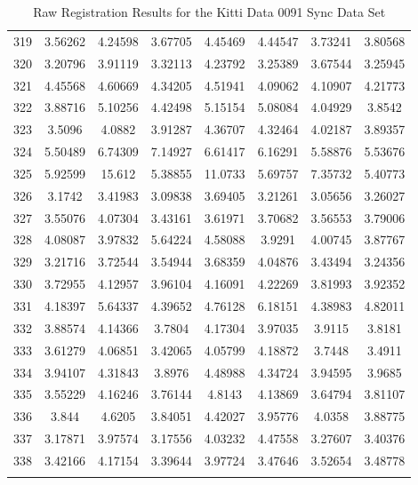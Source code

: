 \begin{center}
\begin{longtable}{cccccccc}
319 & 3.56262 & 4.24598 & 3.67705 & 4.45469 & 4.44547 & 3.73241 & 3.80568\\
320 & 3.20796 & 3.91119 & 3.32113 & 4.23792 & 3.25389 & 3.67544 & 3.25945\\
321 & 4.45568 & 4.60669 & 4.34205 & 4.51941 & 4.09062 & 4.10907 & 4.21773\\
322 & 3.88716 & 5.10256 & 4.42498 & 5.15154 & 5.08084 & 4.04929 & 3.8542\\
323 & 3.5096 & 4.0882 & 3.91287 & 4.36707 & 4.32464 & 4.02187 & 3.89357\\
324 & 5.50489 & 6.74309 & 7.14927 & 6.61417 & 6.16291 & 5.58876 & 5.53676\\
325 & 5.92599 & 15.612 & 5.38855 & 11.0733 & 5.69757 & 7.35732 & 5.40773\\
326 & 3.1742 & 3.41983 & 3.09838 & 3.69405 & 3.21261 & 3.05656 & 3.26027\\
327 & 3.55076 & 4.07304 & 3.43161 & 3.61971 & 3.70682 & 3.56553 & 3.79006\\
328 & 4.08087 & 3.97832 & 5.64224 & 4.58088 & 3.9291 & 4.00745 & 3.87767\\
329 & 3.21716 & 3.72544 & 3.54944 & 3.68359 & 4.04876 & 3.43494 & 3.24356\\
330 & 3.72955 & 4.12957 & 3.96104 & 4.16091 & 4.22269 & 3.81993 & 3.92352\\
331 & 4.18397 & 5.64337 & 4.39652 & 4.76128 & 6.18151 & 4.38983 & 4.82011\\
332 & 3.88574 & 4.14366 & 3.7804 & 4.17304 & 3.97035 & 3.9115 & 3.8181\\
333 & 3.61279 & 4.06851 & 3.42065 & 4.05799 & 4.18872 & 3.7448 & 3.4911\\
334 & 3.94107 & 4.31843 & 3.8976 & 4.48988 & 4.34724 & 3.94595 & 3.9685\\
335 & 3.55229 & 4.16246 & 3.76144 & 4.8143 & 4.13869 & 3.64794 & 3.81107\\
336 & 3.844 & 4.6205 & 3.84051 & 4.42027 & 3.95776 & 4.0358 & 3.88775\\
337 & 3.17871 & 3.97574 & 3.17556 & 4.03232 & 4.47558 & 3.27607 & 3.40376\\
338 & 3.42166 & 4.17154 & 3.39644 & 3.97724 & 3.47646 & 3.52654 & 3.48778\\
\caption{Raw Registration Results for the Kitti Data 0091 Sync Data Set}
\label{tab:kittidata0091syncFULL}
\end{longtable}
\end{center} 


